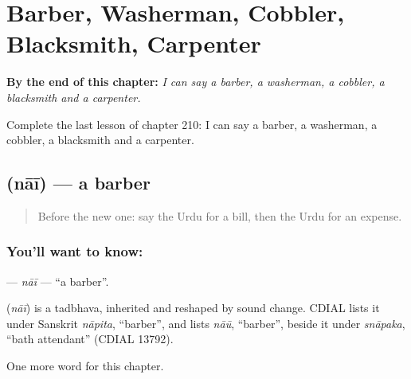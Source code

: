 
\chapter{Barber, Washerman, Cobbler, Blacksmith, Carpenter}
\label{ch:ur-barber-washerman-cobbler-blacksmith-carpenter}

\begin{chapteropening}
\textbf{By the end of this chapter:} \emph{I can say a barber, a washerman, a cobbler, a blacksmith and a carpenter.}

Complete the last lesson of chapter 210: I can say a barber, a washerman, a cobbler, a blacksmith and a carpenter.
\end{chapteropening}

\section[\texorpdfstring{\ur{نائی} (nāī)}{نائی (nāī)}]{ (nāī) — a barber}

\label{lesson:UR-C210-nai}



\begin{quote}
Before the new one: say the Urdu for a bill, then the Urdu for an expense.
\end{quote}

\subsection*{You'll want to know: }
\textbf{} — \emph{nāī} — \textquotedblleft{}a barber\textquotedblright{}.

\begin{cousinweb}
\textbf{} (\emph{nāī}) is a tadbhava, inherited and reshaped by sound change. CDIAL lists it under Sanskrit \emph{nāpita}, \textquotedblleft{}barber\textquotedblright{}, and lists \emph{nāū}, \textquotedblleft{}barber\textquotedblright{}, beside it under \emph{snāpaka}, \textquotedblleft{}bath attendant\textquotedblright{} (CDIAL 13792).
\end{cousinweb}

\begin{grammarlens}[title={What you've built}]
One more word for this chapter.
\end{grammarlens}

